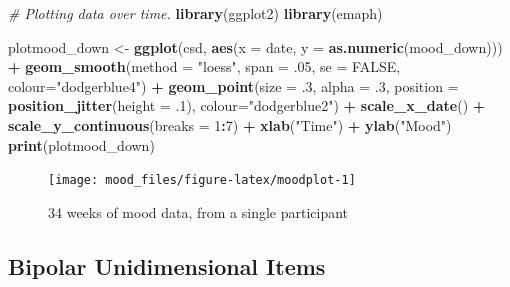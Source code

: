 \documentclass[]{book}
\newenvironment{Shaded}{\begin{snugshade}}{\end{snugshade}}
\newcommand{\KeywordTok}[1]{\textcolor[rgb]{0.13,0.29,0.53}{\textbf{#1}}}
\newcommand{\DataTypeTok}[1]{\textcolor[rgb]{0.13,0.29,0.53}{#1}}
\newcommand{\DecValTok}[1]{\textcolor[rgb]{0.00,0.00,0.81}{#1}}
\newcommand{\StringTok}[1]{\textcolor[rgb]{0.31,0.60,0.02}{#1}}
\newcommand{\CommentTok}[1]{\textcolor[rgb]{0.56,0.35,0.01}{\textit{#1}}}
\newcommand{\OtherTok}[1]{\textcolor[rgb]{0.56,0.35,0.01}{#1}}
\newcommand{\OperatorTok}[1]{\textcolor[rgb]{0.81,0.36,0.00}{\textbf{#1}}}
\newcommand{\NormalTok}[1]{#1}
\begin{document}
\begin{Shaded}
\begin{Highlighting}[]
\CommentTok{# Plotting data over time.}
\KeywordTok{library}\NormalTok{(ggplot2) }
\KeywordTok{library}\NormalTok{(emaph)}

\NormalTok{plotmood_down <-}\StringTok{ }\KeywordTok{ggplot}\NormalTok{(csd, }\KeywordTok{aes}\NormalTok{(}\DataTypeTok{x =}\NormalTok{ date, }\DataTypeTok{y =} \KeywordTok{as.numeric}\NormalTok{(mood_down))) }\OperatorTok{+}
\StringTok{  }\KeywordTok{geom_smooth}\NormalTok{(}\DataTypeTok{method =} \StringTok{"loess"}\NormalTok{, }\DataTypeTok{span =}\NormalTok{ .}\DecValTok{05}\NormalTok{, }\DataTypeTok{se =} \OtherTok{FALSE}\NormalTok{, }\DataTypeTok{colour=}\StringTok{"dodgerblue4"}\NormalTok{) }\OperatorTok{+}\StringTok{ }
\StringTok{  }\KeywordTok{geom_point}\NormalTok{(}\DataTypeTok{size =}\NormalTok{ .}\DecValTok{3}\NormalTok{, }\DataTypeTok{alpha =}\NormalTok{ .}\DecValTok{3}\NormalTok{, }\DataTypeTok{position =} \KeywordTok{position_jitter}\NormalTok{(}\DataTypeTok{height =}\NormalTok{ .}\DecValTok{1}\NormalTok{),}
  \DataTypeTok{colour=}\StringTok{"dodgerblue2"}\NormalTok{) }\OperatorTok{+}\StringTok{  }\KeywordTok{scale_x_date}\NormalTok{() }\OperatorTok{+}\StringTok{ }\KeywordTok{scale_y_continuous}\NormalTok{(}\DataTypeTok{breaks =} \DecValTok{1}\OperatorTok{:}\DecValTok{7}\NormalTok{) }\OperatorTok{+}
\StringTok{  }\KeywordTok{xlab}\NormalTok{(}\StringTok{"Time"}\NormalTok{) }\OperatorTok{+}\StringTok{ }\KeywordTok{ylab}\NormalTok{(}\StringTok{"Mood"}\NormalTok{) }
\KeywordTok{print}\NormalTok{(plotmood_down)}
\end{Highlighting}
\end{Shaded}

\begin{figure}

{\centering \texttt{[image: mood\_files/figure-latex/moodplot-1]} 

}

\caption{34 weeks of mood data, from a single participant}\label{fig:moodplot}
\end{figure}

\subsection{Bipolar Unidimensional
Items}\label{bipolar-unidimensional-items}

\end{document}
